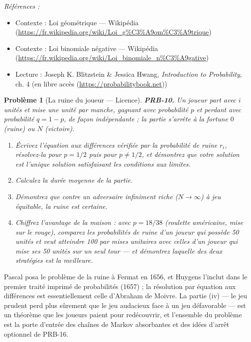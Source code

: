 \documentclass[11pt]{article}
\newtheorem{problem}{Problème}
\newenvironment{refs}{\par\small\noindent\emph{Références :}\begin{itemize}\setlength\itemsep{0pt}}{\end{itemize}\normalsize}
\begin{document}
\begin{refs}
\item Contexte : Loi géométrique --- Wikipédia (\url{https://fr.wikipedia.org/wiki/Loi_g%C3%A9om%C3%A9trique})
\item Contexte : Loi binomiale négative --- Wikipédia (\url{https://fr.wikipedia.org/wiki/Loi_binomiale_n%C3%A9gative})
\item Lecture : Joseph K. Blitzstein \& Jessica Hwang, \textit{Introduction to Probability}, ch. 4 (en libre accès (\url{https://probabilitybook.net}))
\end{refs}

\bigskip

\begin{problem}[{La ruine du joueur --- Licence}]
\textbf{PRB-10.} Un joueur part avec $ i $ unités et mise une unité par
manche, gagnant avec probabilité $ p $ et perdant avec probabilité $ q = 1-p $, de façon
indépendante ; la partie s'arrête à la fortune $ 0 $ (ruine) ou $ N $ (victoire).
\begin{enumerate}
\item[(i)] Écrivez l'équation aux différences vérifiée par la probabilité de ruine $ r_i $,
résolvez-la pour $ p = 1/2 $ puis pour $ p \ne 1/2 $, et démontrez que votre solution est
l'unique solution satisfaisant les conditions aux limites.
\item[(ii)] Calculez la durée moyenne de la partie.
\item[(iii)] Démontrez que contre un adversaire infiniment riche ($ N \to \infty $) à jeu équitable, la
ruine est certaine.
\item[(iv)] Chiffrez l'avantage de la maison : avec $ p = 18/38 $ (roulette américaine, mise sur le
rouge), comparez les probabilités de ruine d'un joueur qui possède 50 unités et veut atteindre 100
par mises unitaires avec celles d'un joueur qui mise ses 50 unités sur un seul tour --- et démontrez
laquelle des deux stratégies est la meilleure.
\end{enumerate}

\end{problem}

\noindent Pascal posa le problème de la ruine à Fermat en 1656, et Huygens l'inclut dans
le premier traité imprimé de probabilités (1657) ; la résolution par équation aux différences est
essentiellement celle d'Abraham de Moivre. La partie (iv) --- le jeu prudent perd plus sûrement que
le jeu audacieux face à un jeu défavorable --- est un théorème que les joueurs paient pour
redécouvrir, et l'ensemble du problème est la porte d'entrée des chaînes de Markov absorbantes et
des idées d'arrêt optionnel de PRB-16.
\end{document}
